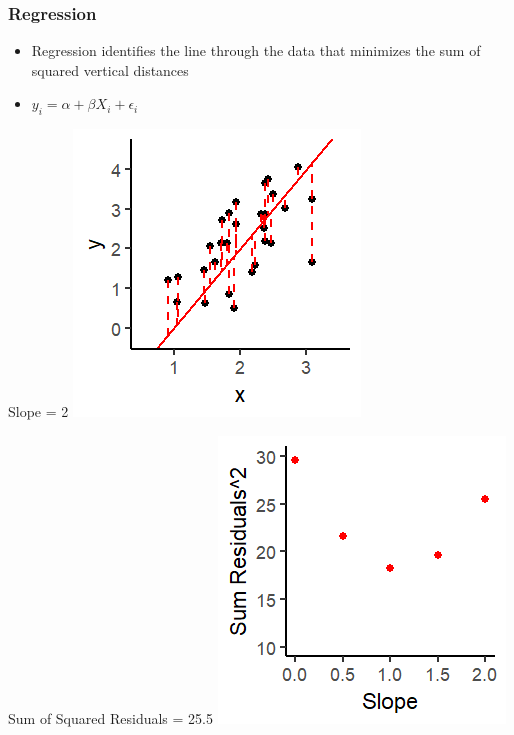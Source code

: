 \documentclass[xcolor=x11names,compress]{beamer}\usepackage[]{graphicx}\usepackage[]{color}
\makeatletter
\def\maxwidth{ %
  \ifdim\Gin@nat@width>\linewidth
    \linewidth
  \else
    \Gin@nat@width
  \fi
}
\newenvironment{knitrout}{}{} %
\renewcommand{\(}{\begin{columns}}
\renewcommand{\)}{\end{columns}}
\newcommand{\<}[1]{\begin{column}{#1}}
\renewcommand{\>}{\end{column}}
\makeatother
\begin{document}
\begin{frame}
\frametitle{Regression}
\begin{itemize}
\item Regression identifies the line through the data that minimizes the sum of squared vertical distances 
\item $y_i = \alpha + \beta X_i + \epsilon_i$
\end{itemize}
\begin{multicols}{2}
Slope = 2
\begin{knitrout}
\color{fgcolor}
\includegraphics[width=\maxwidth]{figure/graph_ols5-1} 

\end{knitrout}
\columnbreak
Sum of Squared Residuals = 25.5
\begin{knitrout}
\color{fgcolor}
\includegraphics[width=\maxwidth]{figure/graph_ssr5-1} 

\end{knitrout}
\end{multicols}
\end{frame}
\end{document}
